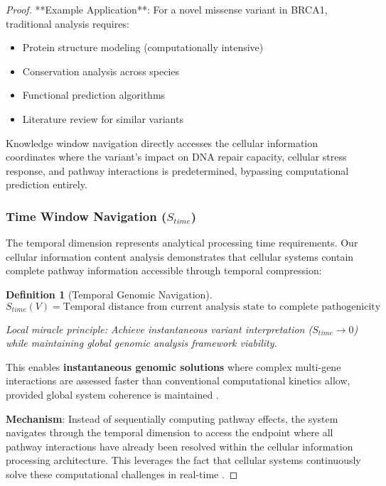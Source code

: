 \documentclass[12pt,a4paper]{article}
\newtheorem{definition}[theorem]{Definition}
\begin{document}
\begin{proof}
**Example Application**: For a novel missense variant in BRCA1, traditional analysis requires:
\begin{itemize}
\item Protein structure modeling (computationally intensive)
\item Conservation analysis across species
\item Functional prediction algorithms
\item Literature review for similar variants
\end{itemize}

Knowledge window navigation directly accesses the cellular information coordinates where the variant's impact on DNA repair capacity, cellular stress response, and pathway interactions is predetermined, bypassing computational prediction entirely.

\subsubsection{Time Window Navigation ($S_{time}$)}

The temporal dimension represents analytical processing time requirements. Our cellular information content analysis demonstrates that cellular systems contain complete pathway information accessible through temporal compression:

\begin{definition}[Temporal Genomic Navigation]
$$S_{time}(V) = \text{Temporal distance from current analysis state to complete pathogenicity assessment}$$

Local miracle principle: Achieve instantaneous variant interpretation ($S_{time} \rightarrow 0$) while maintaining global genomic analysis framework viability.
\end{definition}

This enables \textbf{instantaneous genomic solutions} where complex multi-gene interactions are assessed faster than conventional computational kinetics allow, provided global system coherence is maintained \cite{karczewski2020mutational, collins2020genomic}.

\textbf{Mechanism}: Instead of sequentially computing pathway effects, the system navigates through the temporal dimension to access the endpoint where all pathway interactions have already been resolved within the cellular information processing architecture. This leverages the fact that cellular systems continuously solve these computational challenges in real-time \cite{alberts2014molecular, cooper2018cell}.


\end{proof}
\end{document}
